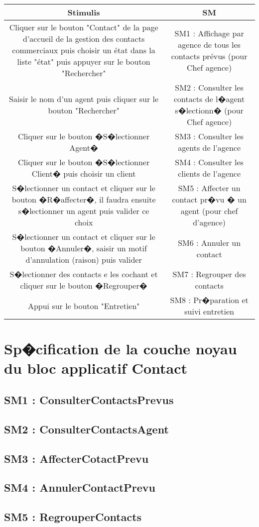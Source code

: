 \begin{tabular}{|c|c|}
\hline
Stimulis 
& SM \\
\hline
Cliquer sur le bouton "Contact" de la page d'accueil de la gestion des contacts commerciaux puis choisir un état dans la liste "état" puis appuyer sur le bouton "Rechercher"
& SM1 : Affichage par agence de tous les contacts prévus (pour Chef agence)\\
\hline
Saisir le nom d'un agent puis cliquer sur le bouton "Rechercher"
& SM2 : Consulter les contacts de l�agent s�lectionn� (pour Chef agence)\\
\hline
Cliquer sur le bouton �S�lectionner Agent�
& SM3 : Consulter les agents de l'agence\\
\hline
Cliquer sur le bouton �S�lectionner Client� puis choisir un client
& SM4 : Consulter les clients de l'agence\\
\hline
S�lectionner un contact et cliquer sur le bouton �R�affecter�, il faudra ensuite s�lectionner un agent puis valider ce choix
& SM5 : Affecter un contact pr�vu � un agent (pour chef d'agence)\\
\hline
S�lectionner un contact et cliquer sur le bouton �Annuler�, saisir un motif d'annulation (raison) puis valider
& SM6 : Annuler un contact\\
\hline
S�lectionner des contacts e les cochant et cliquer sur le bouton �Regrouper�
& SM7 : Regrouper des contacts\\
\hline
Appui sur le bouton "Entretien"
& SM8 : Pr�paration et suivi entretien\\
\hline
\end{tabular}


\section{Sp�cification de la couche noyau du bloc applicatif Contact}

       \subsection{SM1 : ConsulterContactsPrevus}

       \subsection{SM2 : ConsulterContactsAgent}

       \subsection{SM3 : AffecterCotactPrevu}

       \subsection{SM4 : AnnulerContactPrevu}

       \subsection{SM5 : RegrouperContacts}